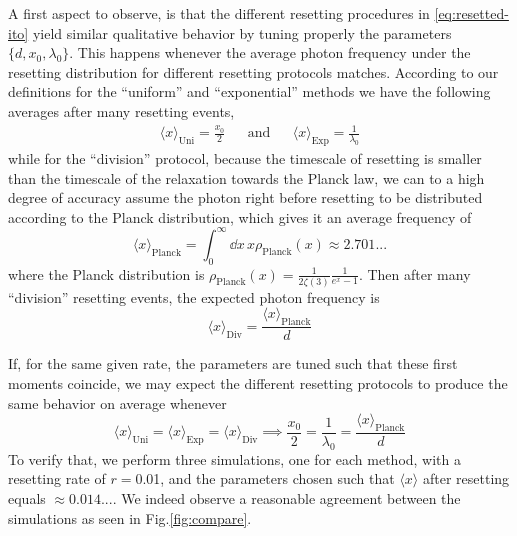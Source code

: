 \documentclass[a4paper,12pt,reqno,superscriptaddress,nofootinbib]{revtex4}
\theoremstyle{plain}
\theoremstyle{definition}
\theoremstyle{remark}
\newcommand{\0}{^{(0)}}
\newcommand{\1}{^{(1)}}
\newcommand{\2}{^{(2)}}
\begin{document}
A first aspect to observe, is that the different resetting procedures in \eqref{eq:resetted-ito} yield similar qualitative behavior by tuning properly the parameters $\{d,x_0,\lambda_0\}$.  This happens whenever the average photon frequency under the resetting distribution for different resetting protocols matches. According to our definitions for the ``uniform'' and ``exponential'' methods we have the following averages after many resetting events,
\begin{align*}\langle x \rangle_{\text{Uni}} = \frac{x_0}{2} &&\text{and}&& \langle x \rangle_\text{Exp} = \frac{1}{\lambda_0}\end{align*}
while for the ``division'' protocol, because the timescale of resetting is smaller than the timescale of the relaxation towards the Planck law, we can to a high degree of accuracy assume the photon right before resetting to be distributed according to the Planck distribution, which gives it an average frequency of
\[\langle x \rangle_\text{Planck} = \int_0^{\infty}\dd x\,  x\rho_\text{Planck}(x) \approx 2.701...\]
where the Planck distribution is $\rho_\text{Planck}(x) = \frac{1}{2\zeta(3)}\frac{1}{e^{x}-1}$. Then after many ``division'' resetting events, the expected photon frequency is
\[\langle x\rangle_{\text{Div}}=\frac{\langle x \rangle_\text{Planck}}{d} \]

If, for the same given rate, the parameters are tuned such that these first moments coincide, we may expect the different resetting protocols to produce the same behavior on average whenever
\[\langle x \rangle_\text{Uni} = \langle x \rangle_\text{Exp}=\langle x\rangle_{\text{Div}} \implies \frac{x_0}{2}=\frac{1}{\lambda_0} = \frac{\langle x \rangle_\text{Planck}}{d}
\]
To verify that, we perform three simulations, one for each method, with a resetting rate of $r=$\num{0.01}, and the parameters chosen such that $\langle x \rangle$ after resetting equals $\approx 0.014...$. We indeed observe a reasonable agreement between the simulations as seen in Fig.\ref{fig:compare}.\\
\end{document}
